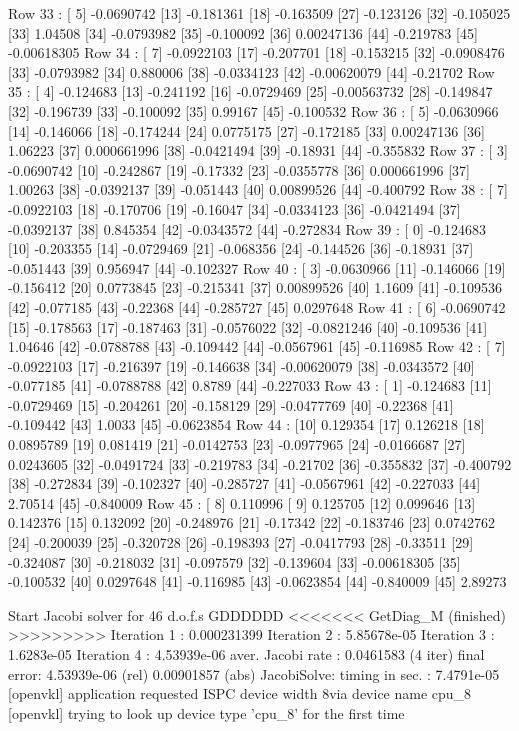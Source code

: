 Row 33 : [ 5]  -0.0690742  [13]  -0.181361  [18]  -0.163509  [27]  -0.123126  [32]  -0.105025  [33]  1.04508  [34]  -0.0793982  [35]  -0.100092  [36]  0.00247136  [44]  -0.219783  [45]  -0.00618305  
Row 34 : [ 7]  -0.0922103  [17]  -0.207701  [18]  -0.153215  [32]  -0.0908476  [33]  -0.0793982  [34]  0.880006  [38]  -0.0334123  [42]  -0.00620079  [44]  -0.21702  
Row 35 : [ 4]  -0.124683  [13]  -0.241192  [16]  -0.0729469  [25]  -0.00563732  [28]  -0.149847  [32]  -0.196739  [33]  -0.100092  [35]  0.99167  [45]  -0.100532  
Row 36 : [ 5]  -0.0630966  [14]  -0.146066  [18]  -0.174244  [24]  0.0775175  [27]  -0.172185  [33]  0.00247136  [36]  1.06223  [37]  0.000661996  [38]  -0.0421494  [39]  -0.18931  [44]  -0.355832  
Row 37 : [ 3]  -0.0690742  [10]  -0.242867  [19]  -0.17332  [23]  -0.0355778  [36]  0.000661996  [37]  1.00263  [38]  -0.0392137  [39]  -0.051443  [40]  0.00899526  [44]  -0.400792  
Row 38 : [ 7]  -0.0922103  [18]  -0.170706  [19]  -0.16047  [34]  -0.0334123  [36]  -0.0421494  [37]  -0.0392137  [38]  0.845354  [42]  -0.0343572  [44]  -0.272834  
Row 39 : [ 0]  -0.124683  [10]  -0.203355  [14]  -0.0729469  [21]  -0.068356  [24]  -0.144526  [36]  -0.18931  [37]  -0.051443  [39]  0.956947  [44]  -0.102327  
Row 40 : [ 3]  -0.0630966  [11]  -0.146066  [19]  -0.156412  [20]  0.0773845  [23]  -0.215341  [37]  0.00899526  [40]  1.1609  [41]  -0.109536  [42]  -0.077185  [43]  -0.22368  [44]  -0.285727  [45]  0.0297648  
Row 41 : [ 6]  -0.0690742  [15]  -0.178563  [17]  -0.187463  [31]  -0.0576022  [32]  -0.0821246  [40]  -0.109536  [41]  1.04646  [42]  -0.0788788  [43]  -0.109442  [44]  -0.0567961  [45]  -0.116985  
Row 42 : [ 7]  -0.0922103  [17]  -0.216397  [19]  -0.146638  [34]  -0.00620079  [38]  -0.0343572  [40]  -0.077185  [41]  -0.0788788  [42]  0.8789  [44]  -0.227033  
Row 43 : [ 1]  -0.124683  [11]  -0.0729469  [15]  -0.204261  [20]  -0.158129  [29]  -0.0477769  [40]  -0.22368  [41]  -0.109442  [43]  1.0033  [45]  -0.0623854  
Row 44 : [10]  0.129354  [17]  0.126218  [18]  0.0895789  [19]  0.081419  [21]  -0.0142753  [23]  -0.0977965  [24]  -0.0166687  [27]  0.0243605  [32]  -0.0491724  [33]  -0.219783  [34]  -0.21702  [36]  -0.355832  [37]  -0.400792  [38]  -0.272834  [39]  -0.102327  [40]  -0.285727  [41]  -0.0567961  [42]  -0.227033  [44]  2.70514  [45]  -0.840009  
Row 45 : [ 8]  0.110996  [ 9]  0.125705  [12]  0.099646  [13]  0.142376  [15]  0.132092  [20]  -0.248976  [21]  -0.17342  [22]  -0.183746  [23]  0.0742762  [24]  -0.200039  [25]  -0.320728  [26]  -0.198393  [27]  -0.0417793  [28]  -0.33511  [29]  -0.324087  [30]  -0.218032  [31]  -0.097579  [32]  -0.139604  [33]  -0.00618305  [35]  -0.100532  [40]  0.0297648  [41]  -0.116985  [43]  -0.0623854  [44]  -0.840009  [45]  2.89273  

 Start Jacobi solver for 46 d.o.f.s
GDDDDDD
<<<<<<<  GetDiag_M (finished)   >>>>>>>>>
Iteration 1 : 0.000231399
Iteration 2 : 5.85678e-05
Iteration 3 : 1.6283e-05
Iteration 4 : 4.53939e-06
aver. Jacobi rate :  0.0461583  (4 iter)
final error: 4.53939e-06 (rel)   0.00901857 (abs)
JacobiSolve: timing in sec. : 7.4791e-05
[openvkl] application requested ISPC device width 8via device name cpu_8
[openvkl] trying to look up device type 'cpu_8' for the first time

